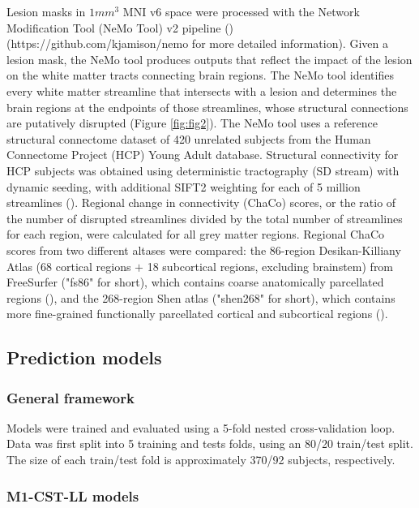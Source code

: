 \documentclass[10pt]{article}
\def\Plus{\texttt{+}}
\begin{document}
Lesion masks in $1mm^3$ MNI v6 space were processed with the Network Modification Tool (NeMo Tool) v2 pipeline (\cite{Kuceyeski2013-nk}) (https://github.com/kjamison/nemo for more detailed information). Given a lesion mask, the NeMo tool produces outputs that reflect the impact of the lesion on the white matter tracts connecting brain regions. The NeMo tool identifies every white matter streamline that intersects with a lesion and determines the brain regions at the endpoints of those streamlines, whose structural connections are putatively disrupted (Figure \ref{fig:fig2}). The NeMo tool uses a reference structural connectome dataset of 420 unrelated subjects from the Human Connectome Project (HCP) Young Adult database. Structural connectivity for HCP subjects was obtained using deterministic tractography (SD stream) with dynamic seeding, with additional SIFT2 weighting for each of 5 million streamlines (\cite{Smith2015-eb}). Regional change in connectivity (ChaCo) scores, or the ratio of the number of disrupted streamlines divided by the total number of streamlines for each region, were calculated for all grey matter regions. Regional ChaCo scores from two different altases were compared: the 86-region Desikan-Killiany Atlas (68 cortical regions $\Plus$ 18 subcortical regions, excluding brainstem) from FreeSurfer ("fs86" for short), which contains coarse anatomically parcellated regions (\cite{Desikan2006-vf,Fischl2002-lb}), and the 268-region Shen atlas ("shen268" for short), which contains more fine-grained functionally parcellated cortical and subcortical regions (\cite{Shen2013-zn}).


\subsection{Prediction models}
\subsubsection*{General framework}

Models were trained and evaluated using a 5-fold nested cross-validation loop. Data was first split into 5 training and tests folds, using an 80/20 train/test split. The size of each train/test fold is approximately 370/92 subjects, respectively. 

\subsubsection*{M1-CST-LL models}
\end{document}
